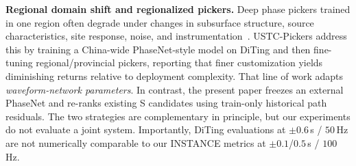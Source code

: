 
\textbf{Regional domain shift and regionalized pickers.}
Deep phase pickers trained in one region often degrade under changes in
subsurface structure, source characteristics, site response, noise, and
instrumentation~\citep{zhu2023ustcpickers}.
USTC-Pickers address this by training a China-wide PhaseNet-style model on
DiTing and then fine-tuning regional/provincial pickers, reporting that finer
customization yields diminishing returns relative to deployment complexity.
That line of work adapts \emph{waveform-network parameters}.
In contrast, the present paper freezes an external PhaseNet and re-ranks
existing S candidates using train-only historical path residuals.
The two strategies are complementary in principle, but our experiments do not
evaluate a joint system.
Importantly, DiTing evaluations at $\pm 0.6$\,s / $50$\,Hz are not numerically
comparable to our INSTANCE metrics at $\pm 0.1$/$0.5$\,s / $100$\,Hz.

